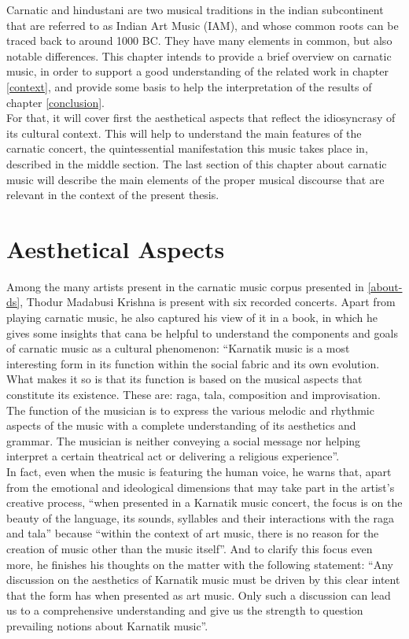 Carnatic and hindustani are two musical traditions in the indian subcontinent that are referred to as Indian Art Music (IAM), and whose common roots can be traced back to around 1000 BC\cite[p.15]{gulati}. They have many elements in common, but also notable differences. This chapter intends to provide a brief overview on carnatic music, in order to support a good understanding of the related work in chapter \ref{context}, and provide some basis to help the interpretation of the results of chapter \ref{conclusion}.\\

For that, it will cover first the aesthetical aspects that reflect the idiosyncrasy of its cultural context. This will help to understand the main features of the carnatic concert, the quintessential manifestation this music takes place in, described in the middle section. The last section of this chapter about carnatic music will describe the main elements of the proper musical discourse that are relevant in the context of the present thesis.


\section{Aesthetical Aspects}

Among the many artists present in the carnatic music corpus presented in \ref{about-ds}, Thodur Madabusi Krishna is present with six recorded concerts. Apart from playing carnatic music, he also captured his view of it in a book\cite{krishna}, in which he gives some insights that cana be helpful to understand the components and goals of carnatic music as a cultural phenomenon: ``Karnatik music is a most interesting form in its function within the social fabric and its own evolution. What makes it so is that its function is based on the musical aspects that constitute its existence. These are: raga, tala, composition and improvisation. The function of the musician is to express the various melodic and rhythmic aspects of the music with a complete understanding of its aesthetics and grammar. The musician is neither conveying a social message nor helping interpret a certain theatrical act or delivering a religious experience''\cite[p.30]{krishna}.\\

In fact, even when the music is featuring the human voice, he warns that, apart from the emotional and ideological dimensions that may take part in the artist's creative process, ``when presented in a Karnatik music concert, the focus is on the beauty of the language, its sounds, syllables and their interactions with the raga and tala'' because ``within the context of art music, there is no reason for the creation of music other than the music itself''\cite[p.33]{krishna}. And to clarify this focus even more, he finishes his thoughts on the matter with the following statement: ``Any discussion on the aesthetics of Karnatik music must be driven by this clear intent that the form has when presented as art music. Only such a discussion can lead us to a comprehensive understanding and give us the strength to question prevailing notions about Karnatik music''\cite[p.34]{krishna}.\\

